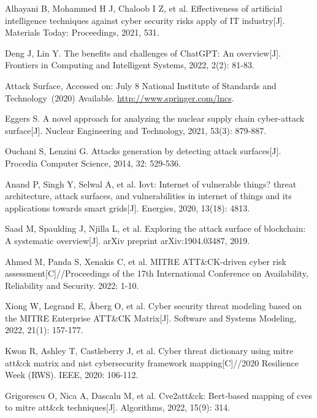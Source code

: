 \documentclass[runningheads]{llncs}
\begin{document}
%
%
%
% 
% 
%
\begin{thebibliography}{8}
Alhayani B, Mohammed H J, Chaloob I Z, et al. Effectiveness of artificial intelligence techniques against cyber security risks apply of IT industry[J]. Materials Today: Proceedings, 2021, 531.

Deng J, Lin Y. The benefits and challenges of ChatGPT: An overview[J]. Frontiers in Computing and Intelligent Systems, 2022, 2(2): 81-83.

Attack Surface, Accessed on: July 8 National Institute of Standards and Technology (2020) Available. \url{http://www.springer.com/lncs}.

Eggers S. A novel approach for analyzing the nuclear supply chain cyber-attack surface[J]. Nuclear Engineering and Technology, 2021, 53(3): 879-887.

Ouchani S, Lenzini G. Attacks generation by detecting attack surfaces[J]. Procedia Computer Science, 2014, 32: 529-536.

Anand P, Singh Y, Selwal A, et al. Iovt: Internet of vulnerable things? threat architecture, attack surfaces, and vulnerabilities in internet of things and its applications towards smart grids[J]. Energies, 2020, 13(18): 4813.

Saad M, Spaulding J, Njilla L, et al. Exploring the attack surface of blockchain: A systematic overview[J]. arXiv preprint arXiv:1904.03487, 2019.

Ahmed M, Panda S, Xenakis C, et al. MITRE ATT\&CK-driven cyber risk assessment[C]//Proceedings of the 17th International Conference on Availability, Reliability and Security. 2022: 1-10.

Xiong W, Legrand E, Åberg O, et al. Cyber security threat modeling based on the MITRE Enterprise ATT\&CK Matrix[J]. Software and Systems Modeling, 2022, 21(1): 157-177.

Kwon R, Ashley T, Castleberry J, et al. Cyber threat dictionary using mitre att\&ck matrix and nist cybersecurity framework mapping[C]//2020 Resilience Week (RWS). IEEE, 2020: 106-112.

Grigorescu O, Nica A, Dascalu M, et al. Cve2att\&ck: Bert-based mapping of cves to mitre att\&ck techniques[J]. Algorithms, 2022, 15(9): 314.


\end{thebibliography}
\end{document}
